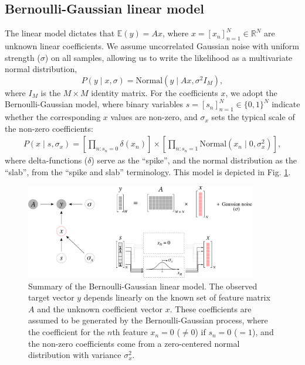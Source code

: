 \documentclass[letter,10pt,oneside]{article}
\newcommand{\be}{\begin{equation*}}
\newcommand{\ee}{\end{equation*}}
\newcommand{\ba}{\begin{eqnarray*}}
\newcommand{\ea}{\end{eqnarray*}}
\newcommand{\+}{^\dagger}
\newcommand{\reffig}[1]{Fig. \ref{#1}}
\begin{document}
\subsection{Bernoulli-Gaussian linear model}
The linear model dictates that $\mathbb{E}(y) = Ax$, where $x = [x_n]_{n=1}^N\in\mathds{R}^N$ are unknown linear coefficients. We assume uncorrelated Gaussian noise with uniform strength ($\sigma$) on all samples, allowing us to write the likelihood as a multivariate normal distribution,
\be
  P(y\;|\;x, \sigma) = \text{Normal}(y\;|\;Ax, \sigma^2 I_M),
\ee
where $I_M$ is the $M\times M$ identity matrix.
For the coefficients $x$, we adopt the Bernoulli-Gaussian model, where binary variables $s = [s_n]_{n=1}^N\in\{0,1\}^N$ indicate whether the corresponding $x$ values are non-zero, and $\sigma_x$ sets the typical scale of the non-zero coefficients:
\ba
  P(x\;|\;s, \sigma_x) = \left[\prod_{n: s_n = 0}\delta(x_n)\right] \times \left[\prod_{n: s_n=1} \text{Normal}(x_n\;|\;0, \sigma_x^2)\right],
\ea
where delta-functions ($\delta$) serve as the ``spike'', and the normal distribution as the ``slab'', from the ``spike and slab'' terminology. This model is depicted in \reffig{fig:summary}.
\begin{figure}[h]
  \centering
  \includegraphics[width=0.9\textwidth]{figs/model-summary.pdf}
  \caption{
    \label{fig:summary}
    Summary of the Bernoulli-Gaussian linear model. The observed target vector $y$ depends linearly on the known set of feature matrix $A$ and the unknown coefficient vector $x$. These coefficients are assumed to be generated by the Bernoulli-Gaussian process, where the coefficient for the $n$th feature $x_n = 0$ ($\neq 0$) if $s_n = 0$ ($=1$), and the non-zero coefficients come from a zero-centered normal distribution with variance $\sigma_x^2$.}
\end{figure}
\end{document}
